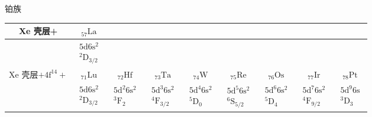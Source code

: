 \begin{center}
\vspace{0.8em}
铂\quad 族\\[0.5em]
\begin{tabular}{|c||c|c|c|c|c|c|c|c|}
\hline
Xe 壳层+ & ${}_{57}\mathrm{La}$ & & & & & & & \\
\hline
 & $\begin{array}{c}5\mathrm{d}6\mathrm{s}^{2}\\{}^{2}\mathrm{D}_{3/2}\end{array}$ & & & & & & & \\
\hline
Xe 壳层$+4\mathrm{f}^{14}+$ & ${}_{71}\mathrm{Lu}$ & ${}_{72}\mathrm{Hf}$ & ${}_{73}\mathrm{Ta}$ & ${}_{74}\mathrm{W}$ & ${}_{75}\mathrm{Re}$ & ${}_{76}\mathrm{Os}$ & ${}_{77}\mathrm{Ir}$ & ${}_{78}\mathrm{Pt}$\\
\hline
 & $\begin{array}{c}5\mathrm{d}6\mathrm{s}^{2}\\{}^{2}\mathrm{D}_{3/2}\end{array}$ &
$\begin{array}{c}5\mathrm{d}^{2}6\mathrm{s}^{2}\\{}^{3}\mathrm{F}_{2}\end{array}$ &
$\begin{array}{c}5\mathrm{d}^{3}6\mathrm{s}^{2}\\{}^{4}\mathrm{F}_{3/2}\end{array}$ &
$\begin{array}{c}5\mathrm{d}^{4}6\mathrm{s}^{2}\\{}^{5}\mathrm{D}_{0}\end{array}$ &
$\begin{array}{c}5\mathrm{d}^{5}6\mathrm{s}^{2}\\{}^{6}\mathrm{S}_{5/2}\end{array}$ &
$\begin{array}{c}5\mathrm{d}^{6}6\mathrm{s}^{2}\\{}^{5}\mathrm{D}_{4}\end{array}$ &
$\begin{array}{c}5\mathrm{d}^{7}6\mathrm{s}^{2}\\{}^{4}\mathrm{F}_{9/2}\end{array}$ &
$\begin{array}{c}5\mathrm{d}^{9}6\mathrm{s}\\{}^{3}\mathrm{D}_{3}\end{array}$\\
\hline
\end{tabular}
\end{center}

